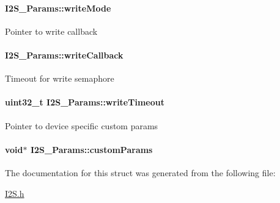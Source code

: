 \paragraph[{write\+Mode}]{ I2\+S\+\_\+\+Params\+::write\+Mode}\label{struct_i2_s___params_a51ab14d450552a917fbadd8c91418ec5}
Pointer to write callback 
\paragraph[{write\+Callback}]{ I2\+S\+\_\+\+Params\+::write\+Callback}\label{struct_i2_s___params_a2cf905e275e93a49707613aedcb2ab9b}
Timeout for write semaphore 
\paragraph[{write\+Timeout}]{\setlength{\rightskip}{0pt plus 5cm}uint32\+\_\+t I2\+S\+\_\+\+Params\+::write\+Timeout}\label{struct_i2_s___params_ae42c67f2e240e631a7d4944aa36e0050}
Pointer to device specific custom params 
\paragraph[{custom\+Params}]{\setlength{\rightskip}{0pt plus 5cm}void$\ast$ I2\+S\+\_\+\+Params\+::custom\+Params}\label{struct_i2_s___params_afb40d7bc5be946e387d5a0af93525d64}


The documentation for this struct was generated from the following file\+:\begin{DoxyCompactItemize}
\item 
\hyperlink{_i2_s_8h}{I2\+S.\+h}\end{DoxyCompactItemize}
